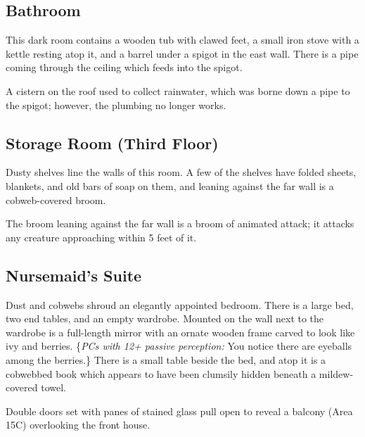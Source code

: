 \pagebreak
\subsection{Bathroom}
\label{sec:Bathroom}
\begin{readout}
  This dark room contains a wooden tub with clawed feet, a small iron stove with a kettle resting atop it,
  and a barrel under a spigot in the east wall. There is a pipe coming through the ceiling which feeds into
  the spigot.
\end{readout}
A cistern on the roof used to collect rainwater, which was borne down a pipe to the spigot; however, the
plumbing no longer works.

\begin{arealinks}
\end{arealinks}


\pagebreak
\subsection{Storage Room (Third Floor)}
\label{sec:StorageRoom3dFlr}
\begin{readout}
  Dusty shelves line the walls of this room. A few of the shelves have folded sheets, blankets, and old bars
  of soap on them, and leaning against the far wall is a cobweb-covered broom.
\end{readout}
The broom leaning against the far wall is a broom of animated attack; it attacks any creature approaching
within 5 feet of it.

\begin{arealinks}
\end{arealinks}


\pagebreak
\subsection{Nursemaid's Suite}
\label{sec:NursemaidsSuite}
\begin{readout}
  Dust and cobwebs shroud an elegantly appointed bedroom. There is a large bed, two end tables, and an
  empty wardrobe. Mounted on the wall next to the wardrobe is a full-length mirror with an ornate wooden
  frame carved to look like ivy and berries. \{\textit{PCs with 12+ passive perception:} You notice there
  are eyeballs among the berries.\} There is a small table beside the bed, and atop it is a cobwebbed book
  which appears to have been clumsily hidden beneath a mildew-covered towel.
\end{readout}
Double doors set with panes of stained glass pull open to reveal a balcony (Area 15C) overlooking the front
house.


